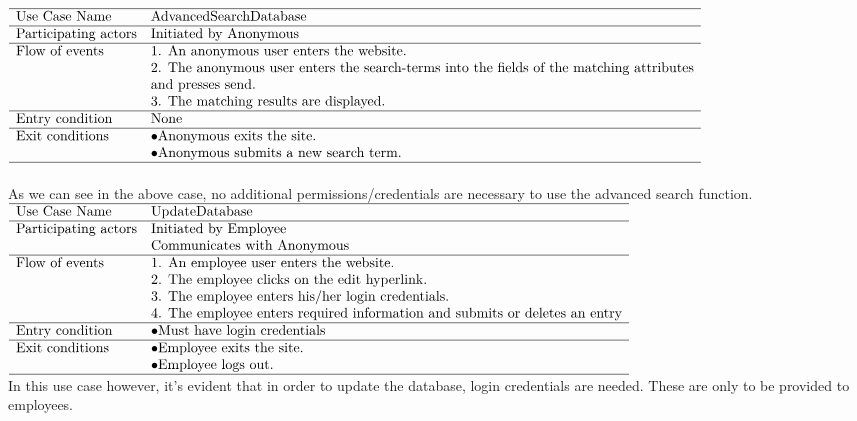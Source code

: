 \documentclass[12pt,a4paper]{article}
\begin{document}
$\begin{array}{ll}
\hline
\text{Use Case Name}	& \text{AdvancedSearchDatabase}\\
\hline
\text{Participating
	actors}	& \text{Initiated by Anonymous}\\
\hline
\text{Flow of events}	& \text{1. An anonymous user enters the website.}\\
& \text{2. The anonymous user enters the search-terms into the fields of the matching attributes} \\
& \text{and presses send.}\\
& \text{3. The matching results are displayed.}\\
\hline
\text{Entry condition}	& \text{None}\\
\hline
\text{Exit conditions}	& \bullet \text{Anonymous exits the site.}\\
& \bullet \text{Anonymous submits a new search term.}\\
\hline
\end{array}$\\
\\
As we can see in the above case, no additional permissions/credentials are necessary to use the advanced search function.\\

$\begin{array}{ll}
\hline
\text{Use Case Name}	& \text{UpdateDatabase}\\
\hline
\text{Participating
	actors}	& \text{Initiated by Employee}\\
& \text{Communicates with Anonymous}\\
\hline
\text{Flow of events}	& \text{1. An employee user enters the website.}\\
& \text{2. The employee clicks on the edit hyperlink.} \\
& \text{3. The employee enters his/her login credentials.}\\
& \text{4. The employee enters required information and submits or deletes an entry}\\
\hline
\text{Entry condition}	& \bullet \text{Must have login credentials}\\
\hline
\text{Exit conditions}	& \bullet \text{Employee exits the site.}\\
& \bullet \text{Employee logs out.}\\
\hline
\end{array}$
\\

In this use case however, it's evident that in order to update the database, login credentials are needed. These are only to be provided to employees.
\newpage
\end{document}
